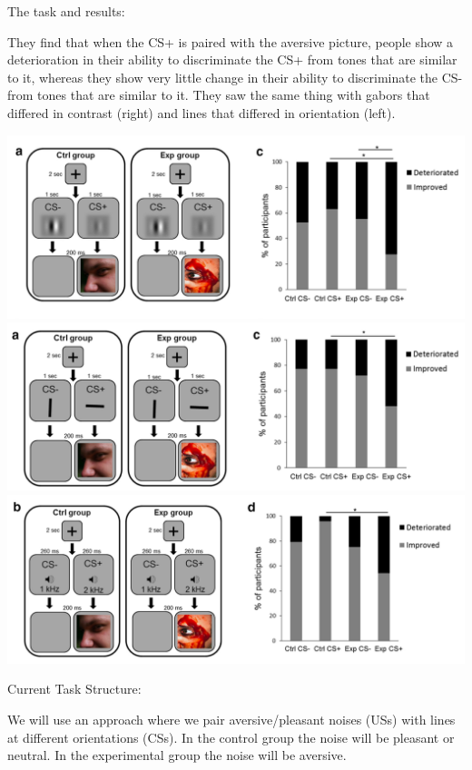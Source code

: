 \documentclass[]{book}
\begin{document}
The task and results:

They find that when the CS+ is paired with the aversive picture, people show a deterioration in their ability to discriminate the CS+ from tones that are similar to it, whereas they show very little change in their ability to discriminate the CS- from tones that are similar to it. They saw the same thing with gabors that differed in contrast (right) and lines that differed in orientation (left).

\includegraphics{images/information/measures/tasks/disc_cond_ext/2.png}
\includegraphics{images/information/measures/tasks/disc_cond_ext/3.png}
\includegraphics{images/information/measures/tasks/disc_cond_ext/4.png}

Current Task Structure:

We will use an approach where we pair aversive/pleasant noises (USs) with lines at different orientations (CSs). In the control group the noise will be pleasant or neutral. In the experimental group the noise will be aversive.
\end{document}
